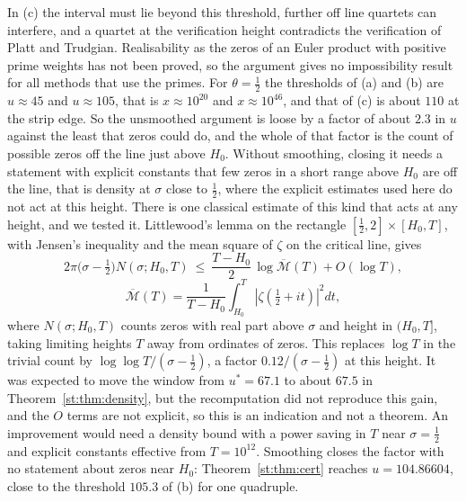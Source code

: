In (c) the interval must lie beyond this threshold, further off line quartets can interfere, and a quartet at the verification height contradicts the verification of Platt and Trudgian. Realisability as the zeros of an Euler product with positive prime weights has not been proved, so the argument gives no impossibility result for all methods that use the primes.
For $\theta=\tfrac12$ the thresholds of (a) and (b) are $u\approx45$ and $u\approx105$, that is $x\approx10^{20}$ and $x\approx10^{46}$, and that of (c) is about $110$ at the strip edge. So the unsmoothed argument is loose by a factor of about $2.3$ in $u$ against the least that zeros could do, and the whole of that factor is the count of possible zeros off the line just above $H_0$. Without smoothing, closing it needs a statement with explicit constants that few zeros in a short range above $H_0$ are off the line, that is density at $\sigma$ close to $\tfrac12$, where the explicit estimates used here do not act at this height. There is one classical estimate of this kind that acts at any height, and we tested it. Littlewood's lemma on the rectangle $[\tfrac12,2]\times[H_0,T]$, with Jensen's inequality and the mean square of $\zeta$ on the critical line, gives
\[
2\pi\big(\sigma-\tfrac12\big)N(\sigma;H_0,T)\ \le\ \frac{T-H_0}2\,\log\overline{\mathcal M}(T)+O(\log T),
\]
\[
\overline{\mathcal M}(T)=\frac1{T-H_0}\int_{H_0}^T|\zeta(\tfrac12+it)|^2dt ,
\]
where $N(\sigma;H_0,T)$ counts zeros with real part above $\sigma$ and height in $(H_0,T]$, taking limiting heights $T$ away from ordinates of zeros. This replaces $\log T$ in the trivial count by $\log\log T/(\sigma-\tfrac12)$, a factor $0.12/(\sigma-\tfrac12)$ at this height. It was expected to move the window from $u^*=67.1$ to about $67.5$ in Theorem~\ref{st:thm:density}, but the recomputation did not reproduce this gain, and the $O$ terms are not explicit, so this is an indication and not a theorem. An improvement would need a density bound with a power saving in $T$ near $\sigma=\tfrac12$ and explicit constants effective from $T=10^{12}$. Smoothing closes the factor with no statement about zeros near $H_0$: Theorem~\ref{st:thm:cert} reaches $u=104.86604$, close to the threshold $105.3$ of (b) for one quadruple.

